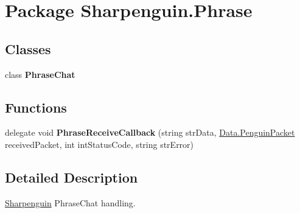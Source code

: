 \hypertarget{namespaceSharpenguin_1_1Phrase}{\section{\-Package \-Sharpenguin.\-Phrase}
\label{namespaceSharpenguin_1_1Phrase}
}
\subsection*{\-Classes}
\begin{DoxyCompactItemize}
\item 
class {\bfseries \-Phrase\-Chat}
\end{DoxyCompactItemize}
\subsection*{\-Functions}
\begin{DoxyCompactItemize}
\item 
\hypertarget{namespaceSharpenguin_1_1Phrase_ac3e645dd9f8881916541323963159cc2}{delegate void {\bfseries \-Phrase\-Receive\-Callback} (string str\-Data, \hyperlink{classSharpenguin_1_1Data_1_1PenguinPacket}{\-Data.\-Penguin\-Packet} received\-Packet, int int\-Status\-Code, string str\-Error)}\label{namespaceSharpenguin_1_1Phrase_ac3e645dd9f8881916541323963159cc2}

\end{DoxyCompactItemize}


\subsection{\-Detailed \-Description}
\hyperlink{namespaceSharpenguin}{\-Sharpenguin} \-Phrase\-Chat handling. 